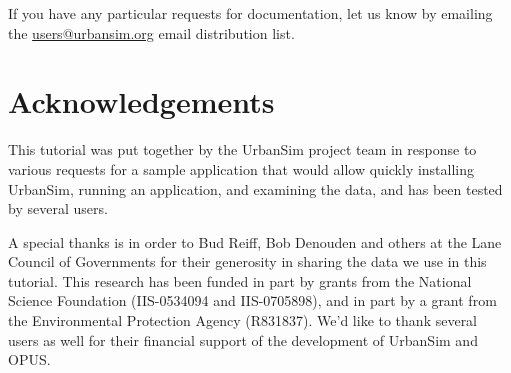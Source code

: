 \documentclass{howto}
\begin{document}
If you have any particular requests for documentation, let us know by emailing
the \url{users@urbansim.org} email distribution list.

\section*{Acknowledgements}

This tutorial was put together by the UrbanSim project team in
response to various requests for a sample application that would
allow quickly installing UrbanSim, running an application, and
examining the data, and has been tested by several users.

A special thanks is in order to Bud Reiff, Bob Denouden and others at the
Lane Council of Governments for their generosity in sharing the data we use
in this tutorial.  This research has been funded in part by grants from the
National Science Foundation (IIS-0534094 and IIS-0705898), and in part by a
grant from the Environmental Protection Agency (R831837).  We'd like
to thank several users as well for their financial support of the
development of UrbanSim and OPUS.
\end{document}
